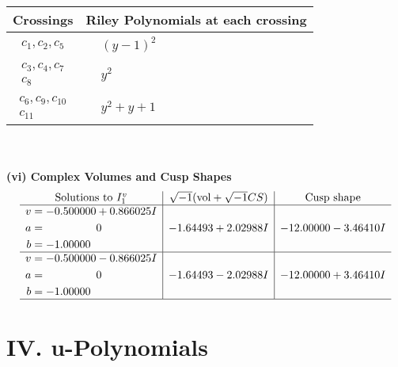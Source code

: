 \documentclass[1p]{elsarticle_modified}
\theoremstyle{definition}
\newcommand{\I}{\sqrt{-1}}
\begin{document}
\begin{tabular}{m{50pt}|m{274pt}}
Crossings & \hspace{64pt}Riley Polynomials at each crossing \\
\hline $$\begin{aligned}c_{1},c_{2},c_{5}\end{aligned}$$&$\begin{aligned}
&(y-1)^2
\end{aligned}$\\
\hline $$\begin{aligned}c_{3},c_{4},c_{7}\\c_{8}\end{aligned}$$&$\begin{aligned}
&y^2
\end{aligned}$\\
\hline $$\begin{aligned}c_{6},c_{9},c_{10}\\c_{11}\end{aligned}$$&$\begin{aligned}
&y^2+y+1
\end{aligned}$\\
\hline
\end{tabular}\\~\\
\newpage\flushleft \textbf{(vi) Complex Volumes and Cusp Shapes}
$$\begin{array}{c|c|c}  
\text{Solutions to }I^v_{1}& \I (\text{vol} + \sqrt{-1}CS) & \text{Cusp shape}\\
 \hline 
\begin{aligned}
v &= -0.500000 + 0.866025 I \\
a &= \phantom{-0.000000 } 0 \\
b &= -1.00000\phantom{ +0.000000I}\end{aligned}
 & -1.64493 + 2.02988 I & -12.00000 - 3.46410 I \\ \hline\begin{aligned}
v &= -0.500000 - 0.866025 I \\
a &= \phantom{-0.000000 } 0 \\
b &= -1.00000\phantom{ +0.000000I}\end{aligned}
 & -1.64493 - 2.02988 I & -12.00000 + 3.46410 I\\
 \hline 
 \end{array}$$\newpage
\newpage\renewcommand{\arraystretch}{1}
\centering \section*{ IV. u-Polynomials}
\end{document}
